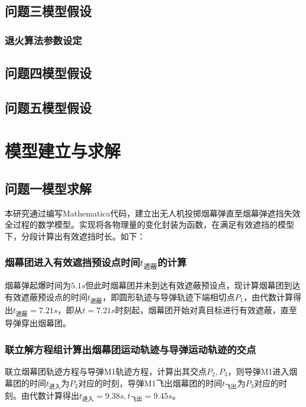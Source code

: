 \documentclass{article}
\begin{document}
\subsection{问题三模型假设}

\subsubsection{退火算法参数设定}

\subsection{问题四模型假设}

\subsection{问题五模型假设}

\section{模型建立与求解}

\subsection{问题一模型求解}

本研究通过编写Mathematica代码，建立出无人机投掷烟幕弹直至烟幕弹遮挡失效全过程的数学模型。实现将各物理量的变化封装为函数，在满足有效遮挡的模型下，分段计算出有效遮挡时长。如下：

\subsubsection{烟幕团进入有效遮挡预设点时间$t_\text{遮蔽}$的计算}
烟幕弹起爆时间为$5.1s$但此时烟幕团并未到达有效遮蔽预设点，现计算烟幕团到达有效遮蔽预设点的时间$t_\text{遮蔽}$，即圆形轨迹与导弹轨迹下端相切点$P_1$，由代数计算得出$t_\text{遮蔽} = 7.21s$，即从$t=7.21s$时刻起，烟幕团开始对真目标进行有效遮蔽，直至导弹穿出烟幕团。

\subsubsection{联立解方程组计算出烟幕团运动轨迹与导弹运动轨迹的交点}
联立烟幕团轨迹方程与导弹M1轨迹方程，计算出其交点$P_2,P_3$，则导弹M1进入烟幕团的时间$t_{\text{进入}}$为$P_2$对应的时刻，导弹M1飞出烟幕团的时间$t_{\text{飞出}}$为$P_3$对应的时刻。由代数计算得出$t_{\text{进入}} = 9.38s,t_{\text{飞出}} = 9.45s$。
\end{document}
